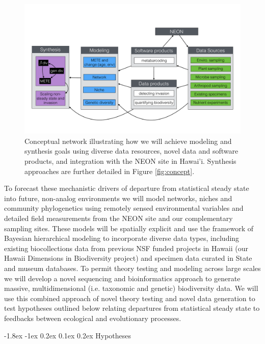 \documentclass[11pt]{article}
\makeatletter
\renewcommand\subsubsection{\@startsection{subsection}{1}{\z@}%
                                  {-1.8ex \@plus -1ex \@minus 0.2ex}%
                                  {0.1ex \@plus 0.2ex}%
                                  {\normalfont\bfseries}}
\makeatother
\begin{document}
\begin{figure}[!htb]
  \centering
  \includegraphics[scale=0.4]{../figs/fig_research.pdf}
  \caption{Conceptual network illustrating how we will achieve
    modeling and synthesis goals using diverse data resources, novel
    data and software products, and integration with the NEON site in
    Hawai'i. Synthesis approaches are further detailed in Figure
    \ref{fig:concept}.}
  \label{fig:research}
\end{figure}

To forecast these mechanistic drivers of departure from statistical
steady state into future, non-analog environments we will model
networks, niches and community phylogenetics using remotely sensed
environmental variables and detailed field measurements from the NEON
site and our complementary sampling sites.  These models will be
spatially explicit and use the framework of Bayesian hierarchical
modeling to incorporate diverse data types, including existing
biocollections data from previous NSF funded projects in Hawaii (our
Hawaii Dimensions in Biodiversity project) and specimen data curated
in State and museum databases.  To permit theory testing and modeling
across large scales we will develop a novel sequencing and
bioinformatics approach to generate massive, multidimensional
(i.e. taxonomic and genetic) biodiversity data.  We will use this
combined approach of novel theory testing and novel data generation to
test hypotheses outlined below relating departures from statistical
steady state to feedbacks between ecological and evolutionary
processes.

\subsubsection{Hypotheses}
\label{sec:hyp}
\end{document}
